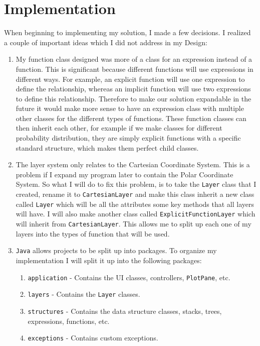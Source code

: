 \documentclass[../../../main.tex]{subfiles}
\begin{document}
\chapter{Implementation}
When beginning to implementing my solution, I made a few decisions. I realized a couple of important ideas which I did not address in my Design:
\begin{enumerate}
\item My function class designed was more of a class for an expression instead of a function. This is significant because different functions will use expressions in different ways. For example, an explicit function will use one expression to define the relationship, whereas an implicit function will use two expressions to define this relationship. Therefore to make our solution expandable in the future it would make more sense to have an expression class with multiple other classes for the different types of functions. These function classes can then inherit each other, for example if we make classes for different probability distribution, they are simply explicit functions with a specific standard structure, which makes them perfect child classes.
\item The layer system only relates to the Cartesian Coordinate System. This is a problem if I expand my program later to contain the Polar Coordinate System. So what I will do to fix this problem, is to take the \texttt{Layer} class that I created, rename it to \texttt{CartesianLayer} and make this class inherit a new class called \texttt{Layer} which will be all the attributes some key methods that all layers will have. I will also make another class called \texttt{ExplicitFunctionLayer} which will inherit from \texttt{CartesianLayer}. This allows me to split up each one of my layers into the types of function that will be used.
\item \texttt{Java} allows projects to be split up into packages. To organize my implementation I will split it up into the following packages:
	\begin{enumerate}
	\item \texttt{application} - Contains the UI classes, controllers, \texttt{PlotPane}, etc.
	\item \texttt{layers} - Contains the \texttt{Layer} classes.
	\item \texttt{structures} - Contains the data structure classes, stacks, trees, expressions, functions, etc.
	\item \texttt{exceptions} - Contains custom exceptions.
	\end{enumerate}
\end{enumerate}

\newpage
\end{document}
